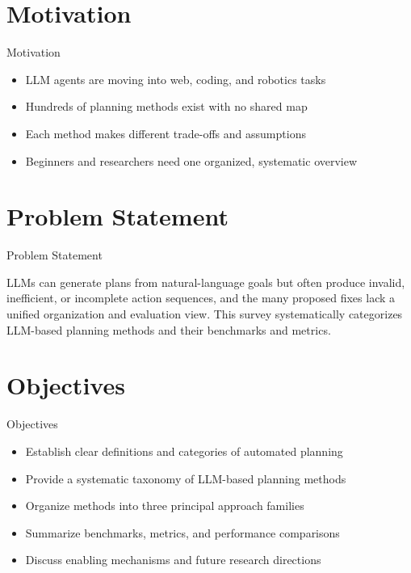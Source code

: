 \documentclass[10pt]{beamer}
\begin{document}
\section{Motivation}
\begin{frame}{Motivation}
\begin{itemize}
  \item LLM agents are moving into web, coding, and robotics tasks
  \item Hundreds of planning methods exist with no shared map
  \item Each method makes different trade-offs and assumptions
  \item Beginners and researchers need one organized, systematic overview
\end{itemize}
\end{frame}

\section{Problem Statement}
\begin{frame}{Problem Statement}
  \begin{block}{}
  LLMs can generate plans from natural-language goals but often produce invalid, inefficient, or incomplete action sequences, and the many proposed fixes lack a unified organization and evaluation view. This survey systematically categorizes LLM-based planning methods and their benchmarks and metrics.
  \end{block}
\end{frame}

\section{Objectives}
\begin{frame}{Objectives}
\begin{itemize}
  \item Establish clear definitions and categories of automated planning
  \item Provide a systematic taxonomy of LLM-based planning methods
  \item Organize methods into three principal approach families
  \item Summarize benchmarks, metrics, and performance comparisons
  \item Discuss enabling mechanisms and future research directions
\end{itemize}
\end{frame}
\end{document}
